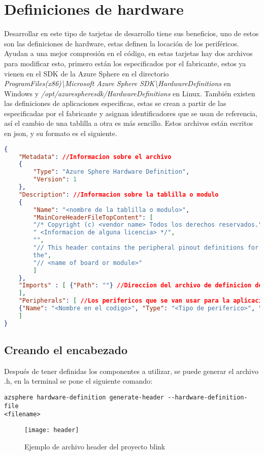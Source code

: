 \section{Definiciones de hardware}
Desarrollar en este tipo de tarjetas de desarrollo tiene sus beneficios, uno de estos son las definiciones de hardware, estas definen la locación de los periféricos. Ayudan a una mejor compresión en el código, en estas tarjetas hay dos archivos para modificar esto, primero están los especificados por el fabricante, estos ya vienen en el SDK de la Azure Sphere en el directorio \textit{ProgramFiles(x86)\textbackslash Microsoft Azure Sphere SDK\textbackslash HardwareDefinitions} en Windows y \textit{/opt/azurespheresdk/HardwareDefinitions} en Linux. También existen las definiciones de aplicaciones especificas, estas se crean a partir de las especificadas por el fabricante y asignan identificadores que se usan de referencia, así el cambio de una tablilla a otra es más sencillo.
Estos archivos están escritos en json, y su formato es el siguiente.
\begin{lstlisting}[language = json, firstnumber=1]
{
	"Metadata": //Informacion sobre el archivo
	{
		"Type": "Azure Sphere Hardware Definition",
		"Version": 1
	},
	"Description": //Informacion sobre la tablilla o modulo
	{
		"Name": "<nombre de la tablilla o modulo>",
		"MainCoreHeaderFileTopContent": [
		"/* Copyright (c) <vendor name> Todos los derechos reservados.",
		" <Informacion de alguna licencia> */",
		"",
		"// This header contains the peripheral pinout definitions for
		the",
		"// <name of board or module>"
		]
	},
	"Imports" : [ {"Path": ""} //Direccion del archivo de definicion de hardware para definir sobre ella
	],
	"Peripherals": [ //Los perifericos que se van usar para la aplicacion
	{"Name": "<Nombre en el codigo>", "Type": "<Tipo de periferico>", "Mapping": "<El nombre del periferico en el archivo importado>", "Comment": "<Informacion a destacar>"},
	]
}
\end{lstlisting}

\subsection{Creando el encabezado}
Después de tener definidas los componentes a utilizar, se puede generar el archivo .h, en la terminal se pone el siguiente comando:
\begin{verbatim}
azsphere hardware-definition generate-header --hardware-definition-file
<filename> 
\end{verbatim}
\begin{figure}[h]
	\centering
	\texttt{[image: header]}
	\caption{Ejemplo de archivo header del proyecto blink}
\end{figure}

